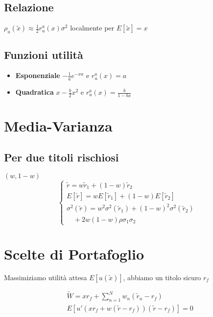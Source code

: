 \documentclass[a4paper,notitlepage]{report}%
\begin{document}
\begin{multicols*}{2}
    \subsection*{Relazione}
    $\rho_u(\tilde{x})\approx\frac{1}{2}r^a_u(x)\sigma^2$ localmente per $E[\tilde{x}]=x$

    \subsection*{Funzioni utilità}
    \begin{itemize}
        \item \textbf{Esponenziale} $-\frac{1}{a}e^{-xa}$ e $r_u^a(x)=a$
        \item \textbf{Quadratica} $x-\frac{b}{2}x^2$ e $r_u^a(x)=\frac{b}{1-bx}$
    \end{itemize}

\section*{Media-Varianza}

    \subsection*{Per due titoli rischiosi}
    $(w,1-w)$
    \[
        \left\{\begin{array}{l}
            \tilde{r}=w\tilde{r}_1+(1-w)\tilde{r}_2 \\
            E[\tilde{r}]=wE[\tilde{r}_1]+(1-w)E[\tilde{r}_2] \\
            \sigma^2(\tilde{r}) = w^2\sigma^2(\tilde{r}_1) + (1-w)^2\sigma^2(\tilde{r}_2)\\
            \quad +2w(1-w)\rho \sigma_1\sigma_2
        \end{array}\right.
    \]

\section*{Scelte di Portafoglio}

    Massimiziamo utilità attesa $E[u(\tilde{x})]$, abbiamo un titolo sicuro $r_f$

    \begin{align*}
        & \tilde{W} =  xr_f +\sum_{n=1}^N w_n (\tilde{r}_n-r_f) \\
        & E[u'(xr_f+w(\tilde{r}-r_f))(\tilde{r}-r_f)] = 0
    \end{align*}
    

\end{multicols*}
\end{document}
